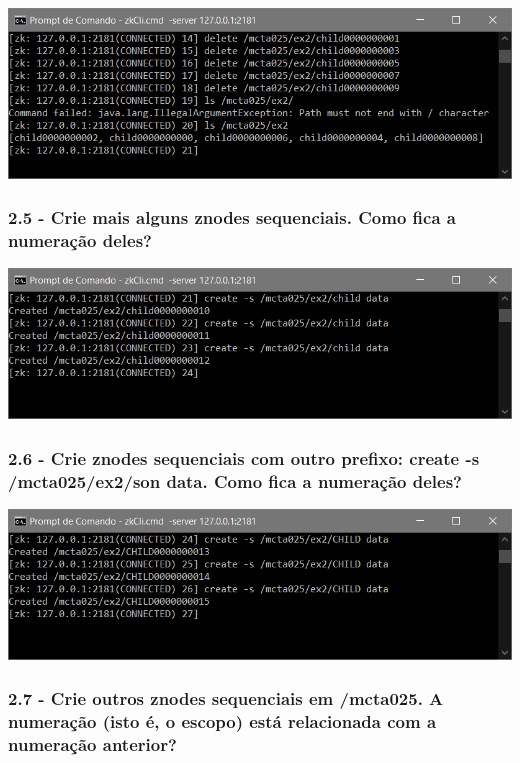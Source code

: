 \includegraphics{pratica3/prints/roteiro 2.4.PNG}

\subsubsection{2.5 - Crie mais alguns znodes sequenciais. Como fica a numeração deles?}

\includegraphics{pratica3/prints/roteiro 2.5.PNG}

\subsubsection{2.6 - Crie znodes sequenciais com outro prefixo: create -s
/mcta025/ex2/son data. Como fica a numeração deles?}

\includegraphics{pratica3/prints/roteiro 2.6.PNG}

\subsubsection{2.7 - Crie outros znodes sequenciais em /mcta025. A numeração (isto é, o escopo) está relacionada com a numeração anterior?}

